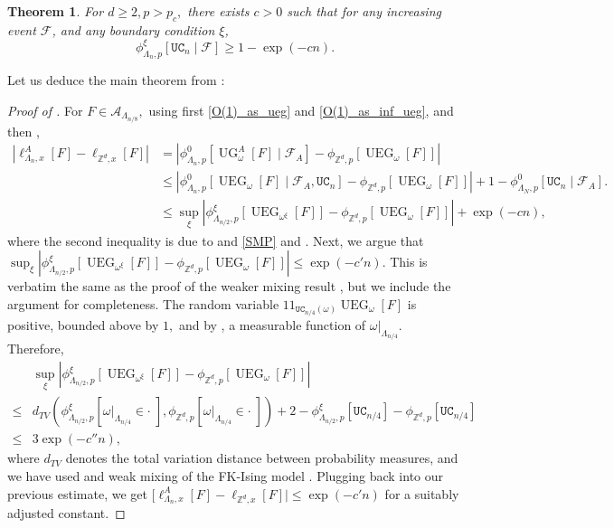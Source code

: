 \documentclass[article,11pt,reqno]{amsart}
\newcommand{\id}{1\! \!1}
\newtheorem{theorem}{Theorem}[section]
\begin{document}
\begin{theorem}
\label{theorem:any_incerasing_event}
For $d\geq 2, p>p_c,$ there exists $c>0$ such that for any increasing event $\mathcal{F}$, and any boundary condition $\xi$,  
$$
\phi^\xi_{\Lambda_n,p}[\mathtt{UC}_n\mid \mathcal{F}]\geq 1-\exp(-cn).
$$ 
\end{theorem}



Let us deduce the main theorem from :
\begin{proof}[Proof of ]


For $F\in  \mathcal{A}_{\Lambda_{n/8}},$  using first \eqref{O(1)_as_ueg} and \eqref{O(1)_as_inf_ueg}, and then ,
\begin{align*}
|\ell^A_{\Lambda_n,x}[F]-\ell_{\mathbb{Z}^d,x}[F]| &=|\phi^0_{\Lambda_n,p}[\operatorname{UG}^A_{\omega}[F]\mid \mathcal{F}_A]-\phi_{\mathbb{Z}^d,p}[\operatorname{UEG}_{\omega}[F]]| \\
&\leq |\phi^0_{\Lambda_n,p}[\operatorname{UEG}_{\omega}[F]\mid \mathcal{F}_A,\mathtt{UC}_n]-\phi_{\mathbb{Z}^d,p}[\operatorname{UEG}_{\omega}[F]]|+1-\phi^0_{\Lambda_N,p}[\mathtt{UC}_n\mid \mathcal{F}_A]. \\
&\leq  \sup_{\xi} |\phi^{\xi}_{\Lambda_{n/2},p}[\operatorname{UEG}_{\omega^{\xi}}[F]]-\phi_{\mathbb{Z}^d,p}[\operatorname{UEG}_{\omega}[F]]|+\exp(-cn),
\end{align*}
where the second inequality is due to  and \eqref{SMP} and .
Next, we argue that $\sup_{\xi}|\phi^{\xi}_{\Lambda_{n/2},p}[\operatorname{UEG}_{\omega^{\xi}}[F]]-\phi_{\mathbb{Z}^d,p}[\operatorname{UEG}_{\omega}[F]]|\leq \exp(-c'n)$. This is verbatim the same as the proof of the weaker mixing result \cite[Theorem 1.3]{hansen2023uniform}, but we include the argument for completeness. The random variable $\id_{\mathtt{UC}_{n/4}(\omega)}\operatorname{UEG}_{\omega}[F]$ is positive, bounded above by $1,$ and by , a measurable function of $\omega|_{\Lambda_{n/4}}.$ Therefore,
\begin{align*}
&\sup_{\xi} |\phi^{\xi}_{\Lambda_{n/2},p}[\operatorname{UEG}_{\omega^{\xi}}[F]]-\phi_{\mathbb{Z}^d,p}[\operatorname{UEG}_{\omega}[F]]|\\
\leq  &d_{TV}(\phi^{\xi}_{\Lambda_{n/2},p}[\omega|_{\Lambda_{n/4}}\in \cdot \;],\phi_{\mathbb{Z}^d,p}[\omega|_{\Lambda_{n/4}}\in \cdot \;])+2-\phi^{\xi}_{\Lambda_{n/2},p}[\mathtt{UC}_{n/4}]-\phi_{\mathbb{Z}^d,p}[\mathtt{UC}_{n/4}]\\
\leq & 3\exp(-c''n),
\end{align*}
where $d_{TV}$ denotes the total variation distance between probability measures, and we have used  and weak mixing of the FK-Ising model \cite[Theorem 1.3]{duminil2020exponential}. Plugging back into our previous estimate, we get $[\ell^A_{\Lambda_n,x}[F]-\ell_{\mathbb{Z}^d,x}[F]|\leq \exp(-c'n)$ for a suitably adjusted constant.




\end{proof}
\end{document}
